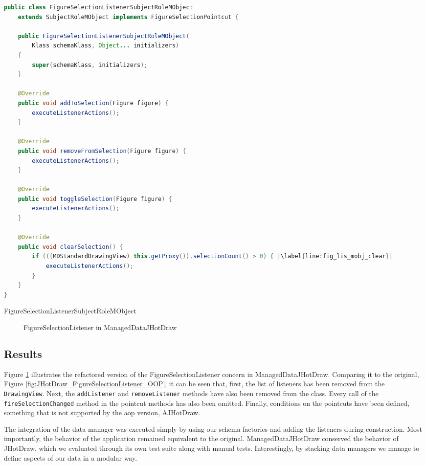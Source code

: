 \begin{sourcecode} [H]
	\begin{lstlisting}[language=Java, escapechar=|]
public class FigureSelectionListenerSubjectRoleMObject 
	extends SubjectRoleMObject implements FigureSelectionPointcut {

	public FigureSelectionListenerSubjectRoleMObject(
		Klass schemaKlass, Object... initializers) 
	{
		super(schemaKlass, initializers);
	}

	@Override
	public void addToSelection(Figure figure) {
		executeListenerActions();
	}

	@Override
	public void removeFromSelection(Figure figure) {
		executeListenerActions();
	}

	@Override
	public void toggleSelection(Figure figure) {
		executeListenerActions();
	}

	@Override
	public void clearSelection() {
		if (((MDStandardDrawingView) this.getProxy()).selectionCount() > 0) { |\label{line:fig_lis_mobj_clear}|
			executeListenerActions();
		}
	}
}
	\end{lstlisting}
	\caption{FigureSelectionListenerSubjectRoleMObject}
	\label{lst:FigureSelectionListenerSubjectRoleMObject}
\end{sourcecode}

\begin{figure} [H]
	\centering
  	\caption{FigureSelectionListener in ManagedDataJHotDraw}
  	\label{fig:JHotDraw_FigureSelectionListener_MD}
\end{figure}

\subsection{Results}
Figure \ref{fig:JHotDraw_FigureSelectionListener_MD} illustrates the refactored version of the FigureSelectionListener concern in ManagedDataJHotDraw.
Comparing it to the original, Figure \ref{fig:JHotDraw_FigureSelectionListener_OOP}, it can be seen that, first, the list of listeners has been removed from the \texttt{DrawingView}. 
Next, the \texttt{addListener} and \texttt{removeListener} methods have also been removed from the class.
Every call of the \texttt{fireSelectionChanged} method in the pointcut methods has also been omitted.
Finally, conditions on the pointcuts have been defined, something that is not supported by the \ac{aop} version, AJHotDraw.

The integration of the data manager was executed simply by using our schema factories and adding the listeners during construction.
Most importantly, the behavior of the application remained equivalent to the original.
ManagedDataJHotDraw conserved the behavior of JHotDraw, which we evaluated through its own test suite along with manual tests.
Interestingly, by stacking data managers we manage to define aspects of our data in a modular way.

